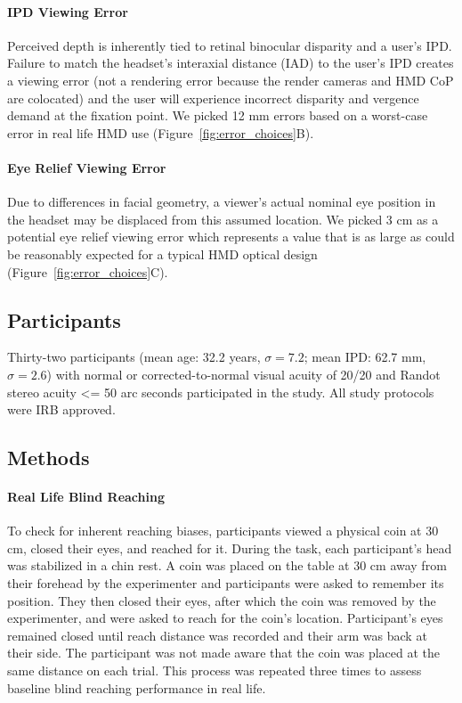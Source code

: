 \paragraph{IPD Viewing Error}
Perceived depth is inherently tied to retinal binocular disparity and a user's IPD. Failure to match the headset's interaxial distance (IAD) to the user's IPD creates a viewing error (not a rendering error because the render cameras and HMD CoP are colocated) and the user will experience incorrect disparity and vergence demand at the fixation point. We picked 12 mm errors based on a worst-case error in real life HMD use (Figure~\ref{fig:error_choices}B).

\paragraph{Eye Relief Viewing Error}
Due to differences in facial geometry, a viewer's actual nominal eye position in the headset may be displaced from this assumed location. We picked 3 cm as a potential eye relief viewing error which represents a value that is as large as could be reasonably expected for a typical HMD optical design (Figure~\ref{fig:error_choices}C).

\subsection{Participants}
Thirty-two participants (mean age: 32.2 years, $\sigma=7.2$; mean IPD: 62.7 mm, $\sigma=2.6$) with normal or corrected-to-normal visual acuity of 20/20 and Randot stereo acuity <= 50 arc seconds participated in the study. All study protocols were IRB approved.

\subsection{Methods}
\paragraph{Real Life Blind Reaching}
To check for inherent reaching biases, participants viewed a physical coin at 30 cm, closed their eyes, and reached for it. During the task, each participant's head was stabilized in a chin rest. A coin was placed on the table at 30 cm away from their forehead by the experimenter and participants were asked to remember its position. They then closed their eyes, after which the coin was removed by the experimenter, and were asked to reach for the coin's location. Participant's eyes remained closed until reach distance was recorded and their arm was back at their side. The participant was not made aware that the coin was placed at the same distance on each trial. This process was repeated three times to assess baseline blind reaching performance in real life.

